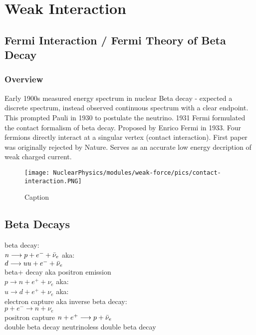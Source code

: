 \chapter{Weak Interaction}
    \section{Fermi Interaction / Fermi Theory of Beta Decay}
        \subsection{Overview}
            \indent Early 1900s measured energy spectrum in nuclear Beta decay - expected a discrete spectrum, instead observed continuous spectrum with a clear endpoint. This prompted Pauli in 1930 to postulate the neutrino. 1931 Fermi formulated the contact formalism of beta decay.
             Proposed by Enrico Fermi in 1933. Four fermions directly interact at a singular vertex (contact interaction). First paper was originally rejected by Nature. Serves as an accurate low energy decription of weak charged current. 
        
        
            \begin{figure}[H]
                \centering
                \texttt{[image: NuclearPhysics/modules/weak-force/pics/contact-interaction.PNG]}
            \caption{Caption}
            \end{figure}
            
            
            
            \section{Beta Decays}
            beta decay:\\
            $n \longrightarrow p + e^- + \Bar{\nu}_e$ aka:\\
            $d \longrightarrow uu + e^- + \Bar{\nu}_e$\\
            beta+ decay aka positron emission\\
            $p \longrightarrow n + e^+ + \nu_e$ aka:\\
            $u \longrightarrow d + e^+ + \nu_e$ aka:\\
            electron capture aka inverse beta decay:\\
            $p + e^- \longrightarrow n + \nu_e$\\
            positron capture
            $n + e^+ \longrightarrow p + \Bar{\nu}_e$\\
            double beta decay
            neutrinoless double beta decay
            
